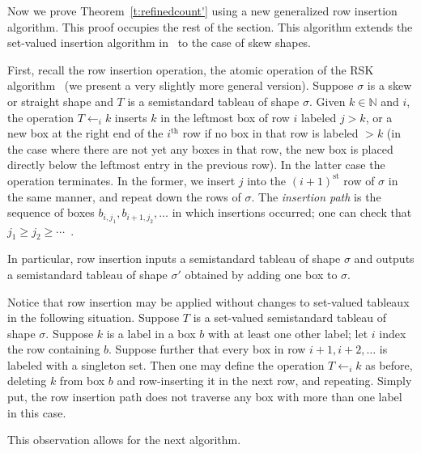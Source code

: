 \documentclass[ALCO,ThmDefs,Unicode,epreuves]{cedram}
\newcommand{\NN}{\mathbb{N}}
\begin{document}
Now we prove Theorem~\ref{t:refinedcount'} using a new generalized row insertion algorithm. This proof occupies the rest of the section. This algorithm extends the set-valued insertion algorithm in~\cite{bandlow-morse-combinatorial} to the case of skew shapes. 

\begin{defi}\label{def:rsk} First, recall the row insertion operation, the atomic operation of the RSK algorithm~\cite[\S~7.11]{ec2} (we present a very slightly more general version). Suppose $\sigma$ is a skew or straight shape and $T$ is a semistandard tableau of shape $\sigma$. Given $k\in \NN$ and $i$, the operation $T\leftarrow_i k$ inserts $k$ in the leftmost box of row $i$ labeled $j>k$, or a new box at the right end of the $i^\text{th}$ row if no box in that row is labeled $>k$ (in the case where there are not yet any boxes in that row, the new box is placed directly below the leftmost entry in the previous row). In the latter case the operation terminates. In the former, we insert $j$ into the $(i+1)^\text{st}$ row of $\sigma$ in the same manner, and repeat down the rows of $\sigma$. The \emph{insertion path} is the sequence of boxes $b_{i,j_1},b_{i+1,j_2},\ldots$ in which insertions occurred; one can check that $j_1 \ge j_2 \ge \cdots$~\cite[Lemma~7.11.2]{ec2}.
\end{defi}

In particular, row insertion inputs a semistandard tableau of shape $\sigma$ and outputs a semistandard tableau of shape $\sigma'$ obtained by adding one box to $\sigma$.

\begin{rema}
Notice that row insertion may be applied without changes to set-valued tableaux in the following situation. Suppose $T$ is a set-valued semistandard tableau of shape $\sigma$. Suppose $k$ is a label in a box $b$ with at least one other label; let $i$ index the row containing $b$. Suppose further that every box in row $i+1,i+2,\ldots$ is labeled with a singleton set. Then one may define the operation $T\leftarrow_i k$ as before, deleting $k$ from box $b$ and row-inserting it in the next row, and repeating. Simply put, the row insertion path does not traverse any box with more than one label in this case.

This observation allows for the next algorithm.
\end{rema}
\end{document}
